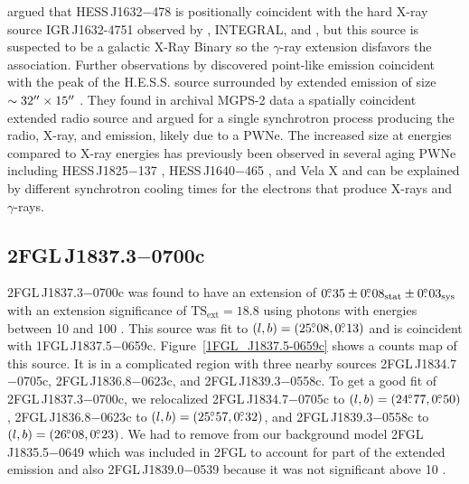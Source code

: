 \documentclass[12pt,preprint]{aastex}
\newcommand{\gev}{\text{GeV}\xspace}
\newcommand{\tev}{\text{TeV}\xspace}
\newcommand{\tsext}{{\ensuremath{\text{TS}_{\text{ext}}}}\xspace}
\newcommand{\asca}{\text{{\em ASCA}}\xspace}
\newcommand{\xmmnewton}{\text{{\em XMM-Newton}}\xspace}
\newcommand{\sys}{\text{sys}\xspace}
\newcommand{\stat}{\text{stat}\xspace}
\begin{document}
\cite{hess_plane_survey} argued that HESS\,J1632$-$478
is positionally coincident with the hard X-ray source
IGR\,J1632-4751 observed by \asca, INTEGRAL, and \xmmnewton
\citep{asca_plane_survey,Igr_J16320-4751_circ,xmm_newton_IGR_J16320-4751},
but this source is suspected to be a galactic X-Ray Binary so the
$\gamma$-ray extension disfavors the association.  Further observations
by \xmmnewton discovered point-like emission coincident with the peak
of the H.E.S.S. source surrounded by extended emission of size
$\sim32\mbox{$^{\prime\prime}$}\times15\mbox{$^{\prime\prime}$}$ \citep{hess_j1632_478_xmm_newton}.
They found in archival MGPS-2 data a spatially coincident extended
radio source \citep{most_survey_galactic_plane} and argued for a single
synchrotron process producing the radio, X-ray, and \tev emission,
likely due to a PWNe.  The increased size at \tev energies compared
to X-ray energies has previously been observed in several aging PWNe
including HESS\,J1825$-$137 \citep{hess_j1825_xmm_newton,hess_j1825_hess},
HESS\,J1640$-$465 \citep{hess_plane_survey,xmm_newton_hess_j_1640-466},
and Vela X \citep{vela_x_rosat,vela_x_hess} and can be explained by
different synchrotron cooling times for the electrons that produce X-rays
and $\gamma$-rays.

\subsection{2FGL\,J1837.3$-$0700c}
\label{section_2FGL_J1837.3-0700c}




2FGL\,J1837.3$-$0700c was found 
to
have an extension of $0\fdg35\pm0\fdg08_\stat\pm0\fdg03_\sys$ with an
extension significance of $\tsext=18.8$
using 
 photons with energies between
10 \gev and 100 \gev.  This source was fit to 
$(l,b)=(25\mbox{$.\!\!^\circ$}08,0\mbox{$.\!\!^\circ$}13)$ and is coincident with 
1FGL\,J1837.5$-$0659c.  Figure~\ref{1FGL_J1837.5-0659c}
shows a counts map of this source.
It is in a complicated region with three nearby
sources 2FGL\,J1834.7$-$0705c, 2FGL\,J1836.8$-$0623c, and
2FGL\,J1839.3$-$0558c.  To get a good fit of 2FGL\,J1837.3$-$0700c, we
relocalized 2FGL\,J1834.7$-$0705c to $(l,b)=(24\mbox{$.\!\!^\circ$}77,0\mbox{$.\!\!^\circ$}50)$,
2FGL\,J1836.8$-$0623c to $(l,b)=(25\mbox{$.\!\!^\circ$}57,0\mbox{$.\!\!^\circ$}32)$, and
2FGL\,J1839.3$-$0558c to $(l,b)=(26\mbox{$.\!\!^\circ$}08,0\mbox{$.\!\!^\circ$}23)$.  We had to remove from
our background model 
2FGL\,J1835.5$-$0649 which was included in 2FGL to account for
part of the extended emission 
and also 2FGL\,J1839.0$-$0539
because it was not significant above 10 \gev. 
\end{document}
